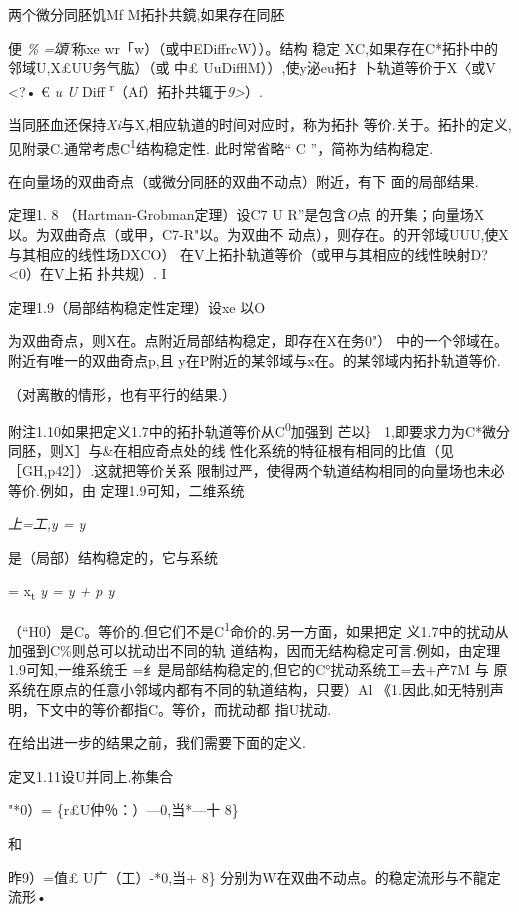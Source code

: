 \documentclass{article}
\begin{document}
两个微分同胚饥Mf M拓扑共鏡,如果存在同胚

便 \emph{\% =頌'}称xe wr「w）（或中EDiffrcW））。结构 稳定
XC,如果存在C*拓扑中的邻域U,X£UU务气肱）（或 中£
UuDifflM））,使y泌eu拓扌卜轨道等价于X〈或V \textless{}?• € \emph{u U}
Diff \textsuperscript{r}（Af）拓扑共辄于\emph{9\textgreater{}}）.

当同胚血还保持\emph{Xi}与X,相应轨道的时间对应时，称为拓扑
等价.关于。拓扑的定义,见附录C.通常考虑C\textsuperscript{1}结构稳定性.
此时常省略`` C ''，简祢为结构稳定.

在向量场的双曲奇点（或微分同胚的双曲不动点）附近，有下 面的局部结果.

定理1. 8 （Hartman-Grobman定理）设C7 U R''是包含\emph{O}点
的开集；向量场X以。为双曲奇点（或甲，C7-R"以。为双曲不
动点），则存在。的开邻域UUU,使X与其相应的线性场DXCO）
在V上拓扑轨道等价（或甲与其相应的线性映射D?\textless{}0）在V上拓
扑共规）. I

定理1.9（局部结构稳定性定理）设xe 以O

为双曲奇点，则X在。点附近局部结构稳定，即存在X在务0"）
中的一个邻域在。附近有唯一的双曲奇点p,且
y在P附近的某邻域与x在。的某邻域内拓扑轨道等价.\textbar{}

（对离散的情形，也有平行的结果.）

附注1.10如果把定义1.7中的拓扑轨道等价从C\textsuperscript{0}加强到 芒以｝
1,即要求力为C*微分同胚，则X］与\&在相应奇点处的线
性化系统的特征根有相同的比值（见［GH,p42］）.这就把等价关系
限制过严，使得两个轨道结构相同的向量场也未必等价.例如，由
定理1.9可知，二维系统

\emph{上=工,y = y}

是（局部）结构稳定的，它与系统

= x\textsubscript{t} \emph{y = y + p y}

（``H0）是C。等价的.但它们不是C\textsuperscript{1}命价的.另一方面，如果把定
义1.7中的扰动从加强到C\%则总可以扰动岀不同的轨
道结构，因而无结构稳定可言.例如，由定理1.9可知,一维系统壬
=纟是局部结构稳定的,但它的C°扰动系统工=去+产7M 与
原系统在原点的任意小邻域内都有不同的轨道结构，只要）Al
《1.因此,如无特别声明，下文中的等价都指C。等价，而扰动都 指U扰动.

在给出进一步的结果之前，我们需要下面的定义.

定叉1.11设U并同上.祢集合

"*0）= \{r£U仲％：）---0,当*---十 8\}

和

昨9）=值£ U\textbar{}广（工）-*0,当+ 8\}
分别为W在双曲不动点。的稳定流形与不龍定流形•
\end{document}
